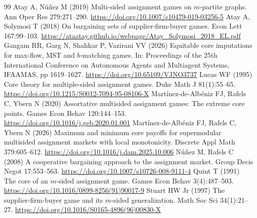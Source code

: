 \documentclass[11pt]{article}
\theoremstyle{remark}\newtheorem{remark}[theorem]{Remark}
\begin{document}
\begin{thebibliography}{99}
\small\setlength{\itemsep}{1pt}
Atay A, N\'u\~nez M (2019) Multi-sided assignment games on $m$-partite graphs.
Ann Oper Res 279:271--290. \url{https://doi.org/10.1007/s10479-019-03256-5}
Atay A, Solymosi T (2018) On bargaining sets of supplier-firm-buyer games.
Econ Lett 167:99--103. \url{https://ataatay.github.io/webpage/Atay_Solymosi_2018_EL.pdf}
Gangam RR, Garg N, Shahkar P, Vazirani VV (2026) Equitable core imputations
for max-flow, MST and $b$-matching games. In: Proceedings of the 25th
International Conference on Autonomous Agents and Multiagent Systems,
IFAAMAS, pp 1619--1627. \url{https://doi.org/10.65109/VJNO3737}
Lucas WF (1995) Core theory for multiple-sided assignment games.
Duke Math J 81(1):55--65. \url{https://doi.org/10.1215/S0012-7094-95-08106-X}
Mart\'inez-de-Alb\'eniz FJ, Rafels C, Ybern N (2020) Assortative multisided
assignment games: The extreme core points. Games Econ Behav 120:144--153.
\url{https://doi.org/10.1016/j.geb.2020.01.001}
Mart\'inez-de-Alb\'eniz FJ, Rafels C, Ybern N (2026) Maximum and minimum core
payoffs for supermodular multisided assignment markets with local monotonicity.
Discrete Appl Math 379:605--612. \url{https://doi.org/10.1016/j.dam.2025.10.006}
N\'u\~nez M, Rafels C (2008) A cooperative bargaining approach to the assignment
market. Group Decis Negot 17:553--563.
\url{https://doi.org/10.1007/s10726-008-9111-4}
Quint T (1991) The core of an $m$-sided assignment game.
Games Econ Behav 3(4):487--503. \url{https://doi.org/10.1016/0899-8256(91)90017-9}
Stuart HW Jr (1997) The supplier-firm-buyer game and its $m$-sided generalization.
Math Soc Sci 34(1):21--27. \url{https://doi.org/10.1016/S0165-4896(96)00830-X}
\end{thebibliography}
\end{document}
